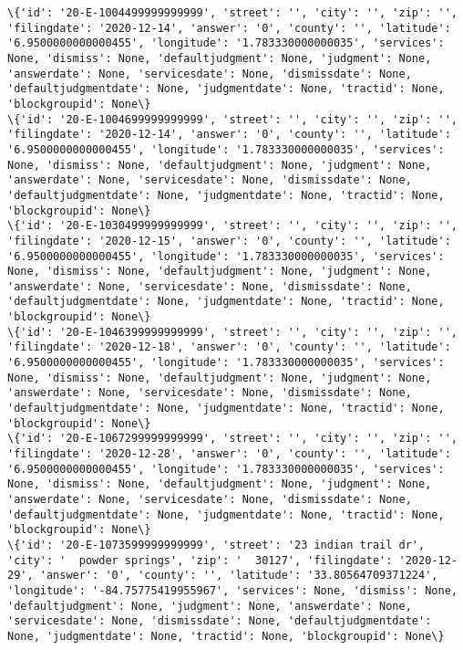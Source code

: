\documentclass[11pt]{article}
\begin{document}
\begin{Verbatim}[commandchars=\\\{\}]
\{'id': '20-E-1004499999999999', 'street': '', 'city': '', 'zip': '', 'filingdate': '2020-12-14', 'answer': '0', 'county': '', 'latitude': '6.9500000000000455', 'longitude': '1.783330000000035', 'services': None, 'dismiss': None, 'defaultjudgment': None, 'judgment': None, 'answerdate': None, 'servicesdate': None, 'dismissdate': None, 'defaultjudgmentdate': None, 'judgmentdate': None, 'tractid': None, 'blockgroupid': None\}
\{'id': '20-E-1004699999999999', 'street': '', 'city': '', 'zip': '', 'filingdate': '2020-12-14', 'answer': '0', 'county': '', 'latitude': '6.9500000000000455', 'longitude': '1.783330000000035', 'services': None, 'dismiss': None, 'defaultjudgment': None, 'judgment': None, 'answerdate': None, 'servicesdate': None, 'dismissdate': None, 'defaultjudgmentdate': None, 'judgmentdate': None, 'tractid': None, 'blockgroupid': None\}
\{'id': '20-E-1030499999999999', 'street': '', 'city': '', 'zip': '', 'filingdate': '2020-12-15', 'answer': '0', 'county': '', 'latitude': '6.9500000000000455', 'longitude': '1.783330000000035', 'services': None, 'dismiss': None, 'defaultjudgment': None, 'judgment': None, 'answerdate': None, 'servicesdate': None, 'dismissdate': None, 'defaultjudgmentdate': None, 'judgmentdate': None, 'tractid': None, 'blockgroupid': None\}
\{'id': '20-E-1046399999999999', 'street': '', 'city': '', 'zip': '', 'filingdate': '2020-12-18', 'answer': '0', 'county': '', 'latitude': '6.9500000000000455', 'longitude': '1.783330000000035', 'services': None, 'dismiss': None, 'defaultjudgment': None, 'judgment': None, 'answerdate': None, 'servicesdate': None, 'dismissdate': None, 'defaultjudgmentdate': None, 'judgmentdate': None, 'tractid': None, 'blockgroupid': None\}
\{'id': '20-E-1067299999999999', 'street': '', 'city': '', 'zip': '', 'filingdate': '2020-12-28', 'answer': '0', 'county': '', 'latitude': '6.9500000000000455', 'longitude': '1.783330000000035', 'services': None, 'dismiss': None, 'defaultjudgment': None, 'judgment': None, 'answerdate': None, 'servicesdate': None, 'dismissdate': None, 'defaultjudgmentdate': None, 'judgmentdate': None, 'tractid': None, 'blockgroupid': None\}
\{'id': '20-E-1073599999999999', 'street': '23 indian trail dr', 'city': '  powder springs', 'zip': '  30127', 'filingdate': '2020-12-29', 'answer': '0', 'county': '', 'latitude': '33.80564709371224', 'longitude': '-84.75775419955967', 'services': None, 'dismiss': None, 'defaultjudgment': None, 'judgment': None, 'answerdate': None, 'servicesdate': None, 'dismissdate': None, 'defaultjudgmentdate': None, 'judgmentdate': None, 'tractid': None, 'blockgroupid': None\}

\end{Verbatim}
\end{document}

